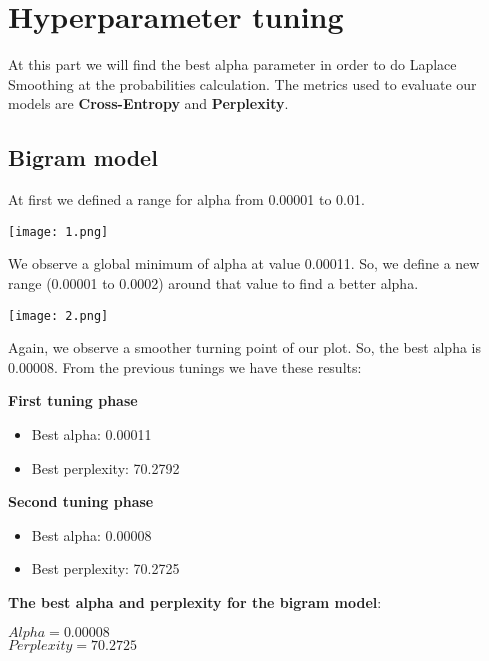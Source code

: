 \documentclass[12pt]{article}
\begin{document}
\section{Hyperparameter tuning}
At this part we will find the best alpha parameter in order to do Laplace Smoothing at the probabilities calculation. The metrics used to evaluate our models are \textbf{Cross-Entropy} and \textbf{Perplexity}.

\subsection{Bigram model}

At first we defined a range for alpha from 0.00001 to 0.01.
\vspace{1cm}

\texttt{[image: 1.png]}
	
\vspace{1cm}

We observe a global minimum of alpha at value 0.00011. So, we define a new range (0.00001 to 0.0002) around that value to find a better alpha.
	


\vspace{1cm}

\texttt{[image: 2.png]}
	
\vspace{1cm}

Again, we observe a smoother turning point of our plot. So, the best alpha is 0.00008.
From the previous tunings we have these results:

\vspace{1cm}

\textbf{First tuning phase}
\begin{itemize}
	\item Best alpha: 0.00011
	\item Best perplexity: 70.2792
\end{itemize}

\textbf{Second tuning phase}
\begin{itemize}
	\item Best alpha: 0.00008
	\item Best perplexity: 70.2725
\end{itemize}

\vspace{1cm}

\textbf{The best alpha and perplexity for the bigram model}:

$Alpha = 0.00008$ \\
$Perplexity =70.2725$
\end{document}
